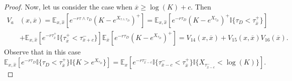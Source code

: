 \documentclass[10pt,a4paper]{amsart}
\def\E{{\mathbb{E}}}
\def\Eq{{\mathbb{E}
		_{x,\hat{x}}}}
\def \R{{{\rm I{\!}\rm R}}}
\def \I{{\mathbb{I}}}
\def\E{{\mathbb E}} \def\PP{\mc P} \def\Z{{\mathbb Z}} \def\R{{\mathbb R}}
\begin{document}
\begin{proof}
			
			Now, let us consider the case when $\overline{x} \geq \log(K) + c$. Then
			\begin{align}\label{V_3}
				V_a&(x,\overline{x}) = \Eq \left[ e^{-r\tau\wedge\tau_D} \left( K - e^{X_{\tau\wedge\tau_D}} \right)^+ \right] =  \Eq\left[ e^{-r\tau_D} \left( K - e^{X_{\tau_D}} \right)^+ \I
				\{ \tau_D < \tau_{\overline{x}}^+ \} \right]
				\\
				\nonumber &+ \Eq\left[ e^{-r\tau_{\overline{x}}^+} \I
				\{\tau_{\overline{x}}^+ < \tau_{\overline{x}+c}^- \} \right]  \E_{\overline{x}}\left[ e^{-r\tau_D} \left( K - e^{X_{\tau_D}} \right)^+ \right] = V_{14}(x,\overline{x}) + V_{15}(x,\overline{x})V_{16}(\overline{x}).
			\end{align}
			Observe that in this case
			\begin{equation*}
				\Eq\left[ e^{-r\tau_D}
				\I \{ \tau_D < \tau_{\overline{x}}^+ \}
				\I \{ K > e^{X_{\tau_D}}\}
				\right] = \E_x \left[ e^{-r\tau_{\overline{x}-c}^- }
				\I \{ \tau_{\overline{x}-c}^- < \tau_{\overline{x}}^+ \}
				\I \{ X_{\tau_{\overline{x}-c}^- } < \log(K)\}
				\right].
			\end{equation*}
			

\end{proof}
\end{document}
